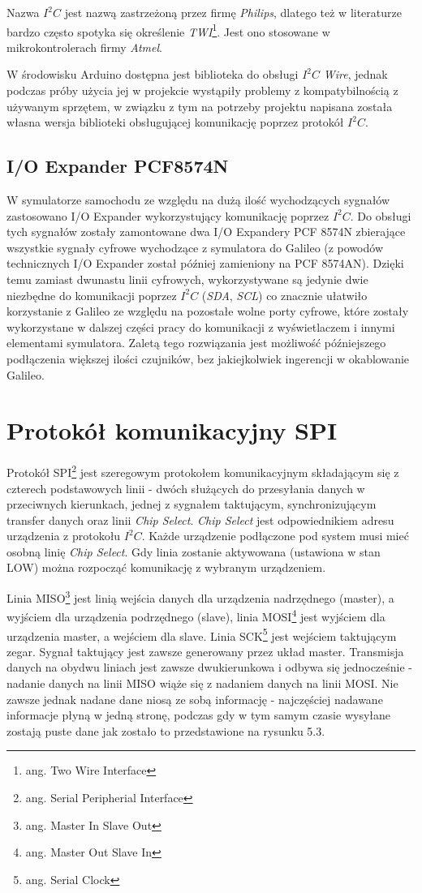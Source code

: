\documentclass{xmgr}
\begin{document}
Nazwa $I^2C$ jest nazwą zastrzeżoną przez firmę \emph{Philips}, dlatego też w literaturze bardzo często spotyka się określenie \emph{TWI}\footnote{ang. Two Wire Interface}. Jest ono stosowane w mikrokontrolerach firmy \emph{Atmel}. 

W środowisku Arduino dostępna jest biblioteka do obsługi $I^2C$ \emph{Wire}, jednak podczas próby użycia jej w projekcie wystąpiły problemy z kompatybilnością z używanym sprzętem, w związku z tym na potrzeby projektu napisana została własna wersja biblioteki obsługującej komunikację poprzez protokół $I^2C$.

\subsection{I/O Expander PCF8574N}
W symulatorze samochodu ze względu na dużą ilość wychodzących sygnałów zastosowano I/O Expander wykorzystujący komunikację poprzez $I^2C$. Do obsługi tych sygnałów zostały zamontowane dwa I/O Expandery PCF 8574N zbierające wszystkie sygnały cyfrowe wychodzące z symulatora do Galileo (z powodów technicznych I/O Expander został później zamieniony na PCF 8574AN). Dzięki temu zamiast dwunastu linii cyfrowych, wykorzystywane są jedynie dwie niezbędne do komunikacji poprzez $I^2C$ (\emph{SDA}, \emph{SCL}) co znacznie ułatwiło korzystanie z Galileo ze względu na pozostałe wolne porty cyfrowe, które zostały wykorzystane w dalszej części pracy do komunikacji z wyświetlaczem i innymi elementami symulatora. Zaletą tego rozwiązania jest możliwość późniejszego podłączenia większej ilości czujników, bez jakiejkolwiek ingerencji w okablowanie Galileo.

\section{Protokół komunikacyjny SPI}
Protokół SPI\footnote{ang. Serial Peripherial Interface} jest szeregowym protokołem komunikacyjnym składającym się z czterech podstawowych linii - dwóch służących do przesyłania danych w przeciwnych kierunkach, jednej z sygnałem taktującym, synchronizującym transfer danych oraz linii \emph{Chip Select}. \emph{Chip Select} jest odpowiednikiem adresu urządzenia z protokołu $I^2C$. Każde urządzenie podłączone pod system musi mieć osobną linię \emph{Chip Select}. Gdy linia zostanie aktywowana (ustawiona w stan LOW) można rozpocząć komunikację z wybranym urządzeniem.

Linia MISO\footnote{ang. Master In Slave Out} jest linią wejścia danych dla urządzenia nadrzędnego (master), a wyjściem dla urządzenia podrzędnego (slave), linia MOSI\footnote{ang. Master Out Slave In} jest wyjściem dla urządzenia master, a wejściem dla slave. Linia SCK\footnote{ang. Serial Clock} jest wejściem taktującym zegar. Sygnał taktujący jest zawsze generowany przez układ master. Transmisja danych na obydwu liniach jest zawsze dwukierunkowa i odbywa się jednocześnie - nadanie danych na linii MISO wiąże się z nadaniem danych na linii MOSI. Nie zawsze jednak nadane dane niosą ze sobą informację - najczęściej nadawane informacje płyną w jedną stronę, podczas gdy w tym samym czasie wysyłane zostają puste dane jak zostało to przedstawione na rysunku 5.3.\cite{Dorra}
\end{document}
